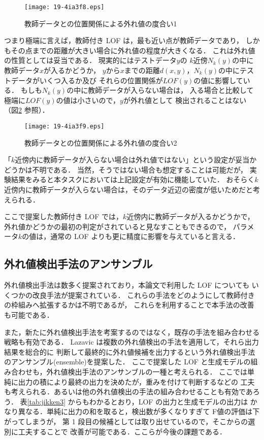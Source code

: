 \documentclass[japanese]{jnlp_1.4}
\begin{document}
\begin{figure}[b]
\begin{center}
\texttt{[image: 19-4ia3f8.eps]}
\end{center}
\caption{教師データとの位置関係による外れ値の度合い1}
\label{kou1}
\end{figure} 

つまり極端に言えば，教師付き LOF は，最も近い点が教師データであり，
しかもその点までの距離が大きい場合に外れ値の程度が大きくなる．
これは外れ値の性質としては妥当である．
現実的にはテストデータ\( y \)の \( k \)近傍\( N_{k}(y) \)の中に教師データ\( x \)が入るかどうか，
\( y \)から\( x \)までの距離\( d(x,y)\)，\( N_{k}(y) \)の中にテストデータがいくつ入るか及び
それらの位置関係が\( LOF(y) \)の値に影響している．
もしも\( N_{k}(y) \)の中に教師データが入らない場合は，
入る場合と比較して極端に\( LOF(y) \)の値は小さいので，\( y \)が外れ値として
検出されることはない（図\ref{kou2} 参照）．

\begin{figure}[t]
\begin{center}
\texttt{[image: 19-4ia3f9.eps]}
\end{center}
\caption{教師データとの位置関係による外れ値の度合い2}
\label{kou2}
\vspace{-1\Cvs}
\end{figure} 

「\( k \)近傍内に教師データが入らない場合は外れ値ではない」という設定が妥当かどうかは不明である．
当然，そうではない場合も想定することは可能だが，
実験結果をみると本タスクにおいては上記設定が有効に機能していた．
おそらく\( k \)近傍内に教師データが入らない場合は，そのデータ近辺の密度が低いためだと考えられる．

ここで提案した教師付き LOF では，\( k \)近傍内に教師データが入るかどうかで，
外れ値かどうかの最初の判定がされていると見なすこともできるので，
パラメータ\( k \)の値は，通常の LOF よりも更に精度に影響を与えていると言える．


\subsection{外れ値検出手法のアンサンブル}

外れ値検出手法は数多く提案されており，本論文で利用した LOF についても
いくつかの改良手法が提案されている\cite{jin,papadimitriou}．
これらの手法をどのようにして教師付きの枠組みへ拡張するかは不明であるが，
これらを利用することで本手法の改善も可能である．

また，新たに外れ値検出手法を考案するのではなく，既存の手法を組み合わせる戦略も有効である．
Lazavic は複数の外れ値検出の手法を適用して，それら出力結果を総合的に
判断して最終的に外れ値候補を出力するという外れ値検出手法のアンサンブル(ensemble)を提案した\cite{lazavic}．
ここで提案した LOF と生成モデルの組み合わせも，外れ値検出手法のアンサンブルの一種と考えられる．
ここでは単純に出力の積により最終の出力を決めたが，重みを付けて判断するなどの
工夫も考えられる．あるいは他の外れ値検出の手法の組み合わせることも有効であろう．
表\ref{tab:jikken3} からもわかるとおり，LOF の出力と生成モデルの出力は
かなり異なる．単純に出力の和を取ると，検出数が多くなりすぎて F値の評価は下がってしまうが，
第 1 段目の候補としては取り出せているので，そこからの選別に工夫することで
改善が可能である．ここらが今後の課題である．
\end{document}
